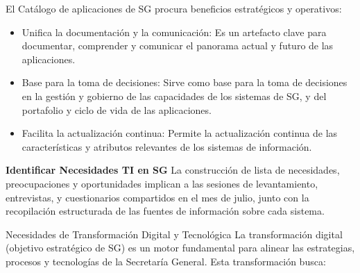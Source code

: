 \documentclass[
	a4paper, %
	12pt, %
]{include/CSSullivanBusinessReport}
\def\tightlist{}
\begin{document}
El Catálogo de aplicaciones de SG procura beneficios estratégicos y
operativos:

\begin{itemize}
\tightlist
\item
  Unifica la documentación y la comunicación: Es un artefacto clave para
  documentar, comprender y comunicar el panorama actual y futuro de las
  aplicaciones.
\item
  Base para la toma de decisiones: Sirve como base para la toma de
  decisiones en la gestión y gobierno de las capacidades de los sistemas
  de SG, y del portafolio y ciclo de vida de las aplicaciones.
\item
  Facilita la actualización continua: Permite la actualización continua
  de las características y atributos relevantes de los sistemas de
  información.
\end{itemize}

\textbf{Identificar Necesidades TI en SG} La construcción de lista de
necesidades, preocupaciones y oportunidades implican a las sesiones de
levantamiento, entrevistas, y cuestionarios compartidos en el mes de
julio, junto con la recopilación estructurada de las fuentes de
información sobre cada sistema.

Necesidades de Transformación Digital y Tecnológica La transformación
digital (objetivo estratégico de SG) es un motor fundamental para
alinear las estrategias, procesos y tecnologías de la Secretaría
General. Esta transformación busca:
\end{document}
